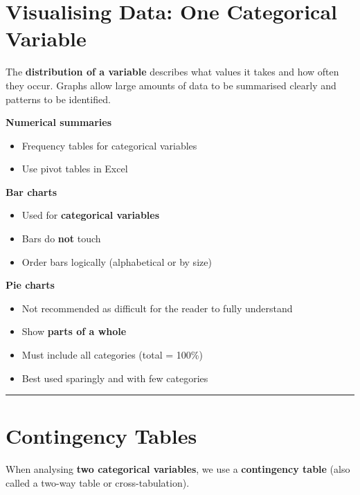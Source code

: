 \documentclass[
  11pt,
  oneside]{scrbook}
\providecommand{\tightlist}{%
  \setlength{\itemsep}{0pt}\setlength{\parskip}{0pt}}
\begin{document}
\section{Visualising Data: One Categorical Variable}\label{visualising-data-one-categorical-variable}

The \textbf{distribution of a variable} describes what values it takes and how often they occur. Graphs allow large amounts of data to be summarised clearly and patterns to be identified.

\textbf{Numerical summaries}

\begin{itemize}
\tightlist
\item
  Frequency tables for categorical variables
\item
  Use pivot tables in Excel
\end{itemize}

\textbf{Bar charts}

\begin{itemize}
\tightlist
\item
  Used for \textbf{categorical variables}
\item
  Bars do \textbf{not} touch
\item
  Order bars logically (alphabetical or by size)
\end{itemize}

\textbf{Pie charts}

\begin{itemize}
\tightlist
\item
  Not recommended as difficult for the reader to fully understand
\item
  Show \textbf{parts of a whole}
\item
  Must include all categories (total = 100\%)
\item
  Best used sparingly and with few categories
\end{itemize}

\begin{center}\rule{0.5\linewidth}{0.5pt}\end{center}

\section{Contingency Tables}\label{contingency-tables}

When analysing \textbf{two categorical variables}, we use a \textbf{contingency table} (also called a two-way table or cross-tabulation).
\end{document}
